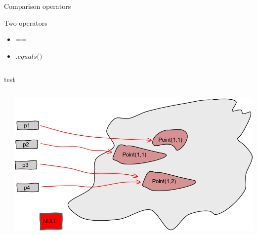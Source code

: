 \documentclass[a4paper, 11pt]{beamer}
\begin{document}
\begin{frame}{Comparison operators}

Two operators
\begin{itemize}
\item $\textit{==}$
\item $\textit{.equals()}$
\end{itemize}
\end{frame}

\begin{frame}
\inputminted[bgcolor=bg, fontsize=\tiny]{java}{./src/equal/Equal.java}
\end{frame}


\begin{frame}{test}

\begin{columns}
    \begin{column}{.3\linewidth}
      \inputminted[bgcolor=bg, fontsize=\tiny]{java}{./src/equal/Equal.java}        
    \end{column}
\vline
    \begin{column}{.5\linewidth}
       \includegraphics[scale=0.2]{img/equal.png}
   
    \end{column}
  \end{columns}
\end{frame}

\end{document}
